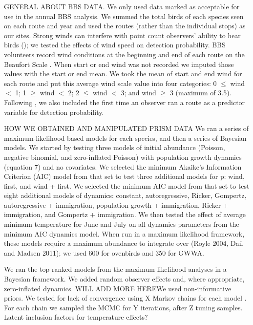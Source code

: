 \documentclass[12pt]{article}
\begin{document}
GENERAL ABOUT BBS DATA.  We only used data marked as acceptable for
use in the annual BBS analysis.  We summed the total birds of each
species seen on each route and year and used the routes (rather than
the individual stops) as our sites.
Strong winds can interfere with point count observers' ability to hear
birds (\citep{simons_etal:2007}); we tested the effects of wind speed
on detection probability.  BBS volunteers record wind conditions at
the beginning and end of each route on the Beaufort Scale
\citep[start and end wind 0-9]{robbins_etal:1986}.
When
start or end wind was not recorded we imputed those values with the
start or end mean.  We took the mean of start and end wind for each
route and put this average wind scale value into four categories: 0 $\leq$
wind $<$ 1; 1 $\geq$ wind $<$ 2; 2 $\leq$ wind $<$ 3; and wind $\geq$ 3 (maximum of 3.5).
Following \citet{link_sauer:2002},
we also included the first time an
observer ran a route as a predictor variable for detection
probability.

HOW WE OBTAINED AND MANIPULATED PRISM DATA
We ran a series of maximum-likelihood based models for each species,
and then a series of Bayesian models.  We started by testing three
models of initial abundance (Poisson, negative binomial, and
zero-inflated Poisson) with population growth dynamics (equation 7)
and no covariates.  We selected the minimum Akaike's Information
Criterion (AIC) model from that set to test three additional models
for p: wind, first, and wind + first.   We selected the minimum AIC
model from that set to test eight additional models of dynamics:
constant, autoregressive, Ricker, Gompertz, autoregressive +
immigration, population growth + immigration, Ricker + immigration,
and Gompertz + immigration.  We then tested the effect of average
minimum temperature for June and July on all dynamics parameters from
the minimum AIC dynamics model.  When run in a maximum likelihood
framework, these models require a maximum abundance to integrate over
(Royle 2004, Dail and Madsen 2011); we used 600 for ovenbirds and 350
for GWWA.

We ran the top ranked models from the maximum likelihood analyses in a
Bayesian framework.  We added random observer effects and, where
appropriate, zero-inflated dynamics.  WILL ADD MORE HEREWe used
non-informative priors.  We tested for lack of convergence using X
Markov chains for each model \citep{gelman_rubin:1992}.
For each chain
we sampled the MCMC for Y iterations, after Z tuning samples.  Latent
inclusion factors for temperature effects?
\end{document}
